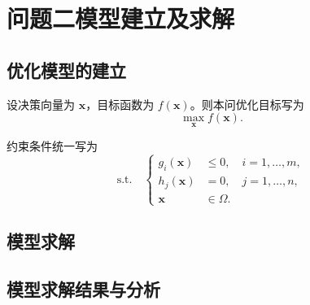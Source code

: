 \section{问题二模型建立及求解}


\subsection{优化模型的建立}


设决策向量为 $\mathbf{x}$，目标函数为 $f(\mathbf{x})$。则本问优化目标写为
\begin{equation}
    \max_{\mathbf{x}} f(\mathbf{x}).
    \label{eq:q2-objective}
\end{equation}

约束条件统一写为
\begin{equation}
\text{s.t.}\quad
\left\{
\begin{aligned}
    g_i(\mathbf{x}) &\le 0, \quad i=1,\ldots,m,\\
    h_j(\mathbf{x}) &= 0, \quad j=1,\ldots,n,\\
    \mathbf{x} &\in \Omega.
\end{aligned}
\right.
\label{eq:q2-constraints}
\end{equation}


\subsection{模型求解}

\subsection{模型求解结果与分析}
%
